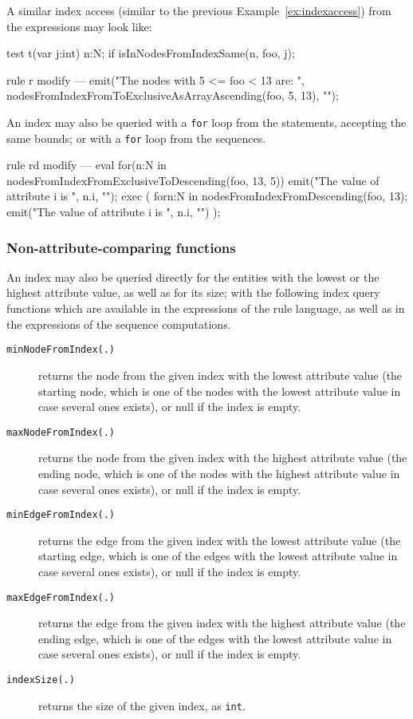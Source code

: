 \begin{example}
A similar index access (similar to the previous Example~\ref{ex:indexaccess}) from the expressions may look like:

\begin{grgen}
test t(var j:int) {
  n:N;
  if { isInNodesFromIndexSame(n, foo, j); }
}

rule r {
  modify {
  ---
    emit("The nodes with 5 <= foo < 13 are: ", nodesFromIndexFromToExclusiveAsArrayAscending(foo, 5, 13), "\n");
  }
}
\end{grgen}

An index may also be queried with a \texttt{for} loop from the statements, accepting the same bounds; 
or with a \texttt{for} loop from the sequences.

\begin{grgen}
rule rd {
  modify {
  ---
    eval {
      for(n:N in nodesFromIndexFromExclusiveToDescending(foo, 13, 5)) {
        emit("The value of attribute i is ", n.i, "\n");
      }
    }
    exec (
      for{n:N in nodesFromIndexFromDescending(foo, 13);
        { emit("The value of attribute i is ", n.i, "\n") }
      }
    );
  }
}
\end{grgen}

\end{example}


\subsubsection*{Non-attribute-comparing functions}

An index may also be queried directly for the entities with the lowest or the highest attribute value, as well as for its size;
with the following index query functions which are available in the expressions of the rule language, as well as in the expressions of the sequence computations.

\begin{description}
\item[\texttt{minNodeFromIndex(.)}] returns the node from the given index with the lowest attribute value (the starting node, which is one of the nodes with the lowest attribute value in case several ones exists), or null if the index is empty.
\item[\texttt{maxNodeFromIndex(.)}] returns the node from the given index with the highest attribute value (the ending node, which is one of the nodes with the highest attribute value in case several ones exists), or null if the index is empty.
\item[\texttt{minEdgeFromIndex(.)}] returns the edge from the given index with the lowest attribute value (the starting edge, which is one of the edges with the lowest attribute value in case several ones exists), or null if the index is empty.
\item[\texttt{maxEdgeFromIndex(.)}] returns the edge from the given index with the highest attribute value (the ending edge, which is one of the edges with the lowest attribute value in case several ones exists), or null if the index is empty.
\item[\texttt{indexSize(.)}] returns the size of the given index, as \texttt{int}.
\end{description}



